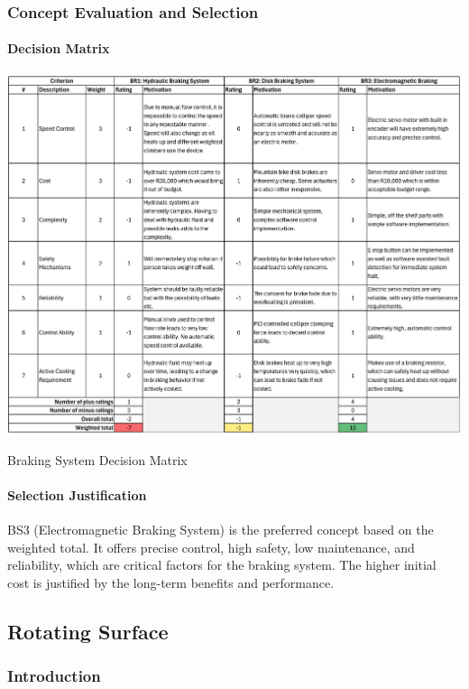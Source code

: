\subsubsection{Concept Evaluation and Selection}

\paragraph{Decision Matrix}

\begin{table}[H]
    \centering
    \includegraphics[width=1\linewidth]{tables/BR_dec_matrix.pdf}
    \caption{Braking System Decision Matrix}
    \label{tab:bs_decision_matrix}
\end{table}

\paragraph{Selection Justification}

BS3 (Electromagnetic Braking System) is the preferred concept based on the weighted total. It offers precise control, high safety, low maintenance, and reliability, which are critical factors for the braking system. The higher initial cost is justified by the long-term benefits and performance.

\subsection{Rotating Surface}

\subsubsection{Introduction}


